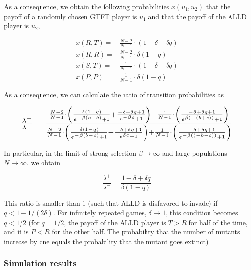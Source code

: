 \documentclass[11pt]{article}
\theoremstyle{plainCl1}
\theoremstyle{plainCl2}
\begin{document}
As a consequence, we obtain the following probabilities \(x(u_1, u_2)\) that the
payoff of a randomly chosen GTFT player is \(u_1\) and that the payoff of the
ALLD player is \(u_2\),

\begin{align*}
  x(R, T) = & \frac{N - 2}{N - 1} \cdot (1 - \delta + \delta q)\\
  x(R, R) = & \frac{N - 2}{N - 1} \cdot \delta (1 - q) \\
  x(S, T) = & \frac{1}{N - 1} \cdot (1 - \delta + \delta q) \\
  x(P, P) = & \frac{1}{N - 1} \cdot \delta (1 - q)
\end{align*}

As a consequence, we can calculate the ratio of transition probabilities as

\begin{equation*}
  \resizebox{.9\textwidth}{!} 
  {$
    \frac{\lambda^{+}}{\lambda^{-}} = \frac{\frac{N - 2}{N - 1} \cdot \left(\frac{\delta(1-q)}{e^{-\beta(c - b)} + 1} + \frac{-\delta +\delta  q + 1}{e^{-\beta c} + 1}\right) + \frac{1}{N - 1} \cdot \left(\frac{-\delta +\delta  q+1}{e^{\beta  (-(b+c))}+1}\right)}
    {\frac{N - 2}{N - 1} \cdot \left(\frac{\delta (1-q)}{e^{-\beta (b-c)}+1} + \frac{-\delta +\delta  q + 1}{e^{\beta  c}+1}\right)+ \frac{1}{N-1} \cdot \left(\frac{-\delta +\delta  q+1}{e^{-\beta  ((-b-c))}+1}\right)}
  $}
\end{equation*}

In particular, in the limit of strong selection \(\beta \rightarrow \infty\) and
large populations \(N \rightarrow \infty \), we obtain

\begin{equation*}
    \frac{\lambda^{+}}{\lambda^{-}} = \frac{1 - \delta + \delta q}{\delta(1 - q)}
\end{equation*}

This ratio is smaller than 1 (such that ALLD is disfavored to invade) if \(q <
1- 1/(2 \delta)\). For infinitely repeated games, \(\delta \rightarrow 1\), this
condition becomes \(q < 1/2\) (for \(q = 1/2\), the payoff of the ALLD player is
\(T > R\) for half of the time, and it is \(P < R\) for the other half. The
probability that the number of mutants increase by one equals the probability
that the mutant goes extinct).

\subsubsection{Simulation results}
\end{document}
